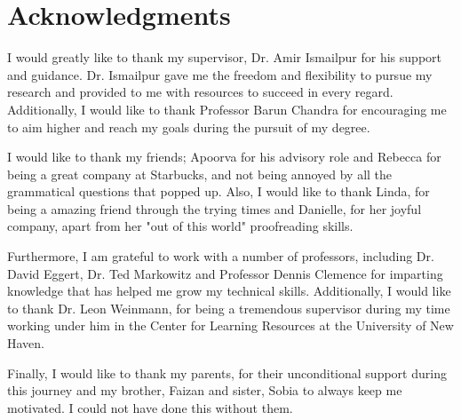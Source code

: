 % 

\cleardoublepage

\section*{Acknowledgments}

I would greatly like to thank my supervisor, Dr. Amir Ismailpur for his support and guidance. Dr. Ismailpur gave me the freedom and flexibility to pursue my research and provided to me with resources to succeed in every regard. Additionally, I would like to thank Professor Barun Chandra for encouraging me to aim higher and reach my goals during the pursuit of my degree.

I would like to thank my friends; Apoorva for his advisory role and Rebecca for being a great company at Starbucks, and not being annoyed by all the grammatical questions that popped up. Also, I would like to thank Linda, for being a amazing friend through the trying times and Danielle, for her joyful company, apart from her "out of this world" proofreading skills.

Furthermore, I am grateful to work with a number of professors, including Dr. David Eggert, Dr. Ted Markowitz and Professor Dennis Clemence for imparting knowledge that has helped me grow my technical skills. Additionally, I would like to thank Dr. Leon Weinmann, for being a tremendous supervisor during my time working under him in the Center for Learning Resources at the University of New Haven.

Finally, I would like to thank my parents, for their unconditional support during this journey and my brother, Faizan and sister, Sobia to always keep me motivated. I could not have done this without them.

